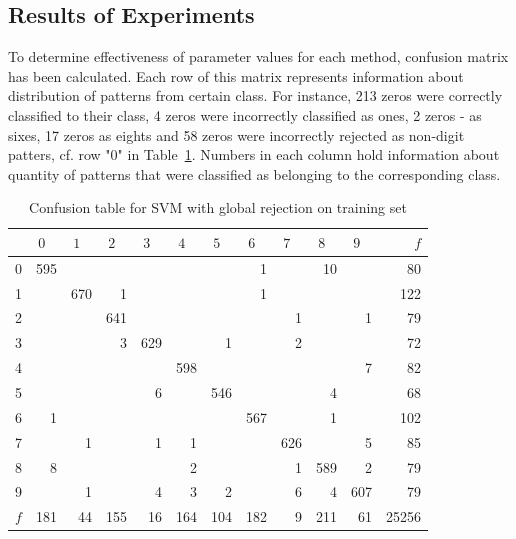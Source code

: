 \documentclass{llncs}
\begin{document}
\subsection{Results of Experiments}
  \label{subsec:ClassificationAndRejection}

To determine effectiveness of parameter values for each method, confusion matrix has been calculated. Each row of this matrix represents information about distribution of patterns from certain class. For instance, 213 zeros were correctly classified to their class, 4 zeros were incorrectly classified as ones, 2 zeros - as sixes, 17 zeros as eights and 58 zeros were incorrectly rejected as non-digit patters, cf. row "0" in Table~\ref{tab:CofusionTable}. Numbers in each column hold information about quantity of patterns that were classified as belonging to the corresponding class.

\begin{table}[h]
\centering
\caption{Confusion table for SVM with global rejection on training set }
\vspace{-3pt}
\setlength{\tabcolsep}{3pt}
\renewcommand{\arraystretch}{1}
{\footnotesize
\begin{tabular}{|c||r|r|r|r|r|r|r|r|r|r|r|}
\hline
 \hspace{15pt} & $0\;\;\;$ & $1\;\;\;$ & $2\;\;\;$ & $3\;\;\;$ & $4\;\;\;$ & $5\;\;\;$ & $6\;\;\;$ & $7\;\;\;$ & $8\;\;\;$ & $9\;\;\;$ & $f$ \\
\hline\hline
  0 & 595 &  &   &   &   &   & 1 &   & 10 &   & 80\\
\hline
  1 &  & 670 & 1 &   &   &   & 1 &   &   &   & 122\\
\hline
  2 &  &   & 641 &   &   &   &   & 1  &   & 1  & 79\\
\hline
  3 &  &   & 3 & 629 &   & 1 &   & 2 &  &   & 72\\
\hline
  4 &  &   &   &   & 598 &   &   &  &  & 7 & 82\\
\hline
  5 &  &   &   & 6 &  & 546 &   &   & 4 &   & 68\\
\hline
  6 & 1 & &   &   &   &   & 567 &   & 1 &   & 102\\
\hline
  7 &  & 1  &  & 1 & 1 &   &   & 626 &   & 5 & 85\\
\hline
  8 & 8 &   &   &   & 2 &   &   & 1 & 589 & 2 & 79\\
\hline
  9 &  & 1 &  & 4 & 3 & 2 &   & 6 & 4 & 607 & 79\\
\hline
$f$ & 181 & 44 & 155 & 16 & 164  & 104 & 182 & 9 & 211 & 61 & 25256\\
\hline
\end{tabular}
}
\vspace{-3pt}
\label{tab:CofusionTable}
\end{table}
\end{document}
